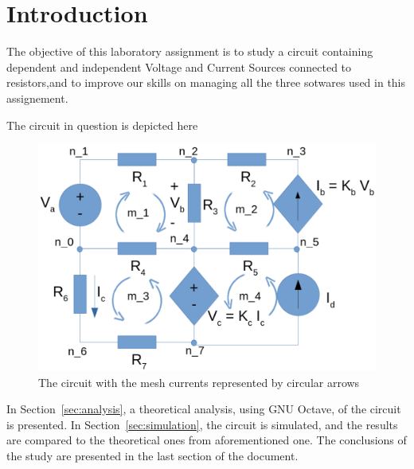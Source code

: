 \section{Introduction}
\label{sec:introduction}



The objective of this laboratory assignment is to study a circuit containing dependent and independent Voltage and Current Sources connected to resistors,and to improve our skills on managing all the three sotwares used in this assignement.

The circuit in question is depicted here
\begin{figure}
  \includegraphics[width=\linewidth]{circuit.png}
  \caption{The circuit with the mesh currents represented by circular arrows}
  \label{fig:circuit}
\end{figure}

In Section~\ref{sec:analysis}, a theoretical analysis, using GNU Octave, of the circuit is presented. In Section~\ref{sec:simulation}, the circuit is simulated, and the results are compared to the theoretical ones from
aforementioned one. The conclusions of the study are presented in the last section of the document.

